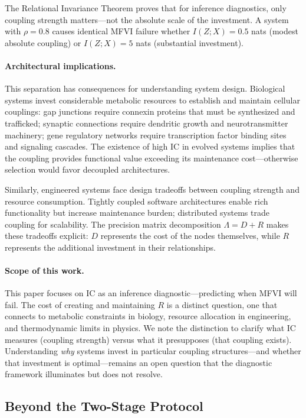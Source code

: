 \documentclass[10pt]{article} %
\theoremstyle{plain}
\theoremstyle{definition}
\begin{document}
\noindent The Relational Invariance Theorem proves that for inference diagnostics, only coupling strength matters---not the absolute scale of the investment. A system with $\rho = 0.8$ causes identical MFVI failure whether $I(Z;X) = 0.5$ nats (modest absolute coupling) or $I(Z;X) = 5$ nats (substantial investment).

\paragraph{Architectural implications.} This separation has consequences for understanding system design. Biological systems invest considerable metabolic resources to establish and maintain cellular couplings: gap junctions require connexin proteins that must be synthesized and trafficked; synaptic connections require dendritic growth and neurotransmitter machinery; gene regulatory networks require transcription factor binding sites and signaling cascades. The existence of high IC in evolved systems implies that the coupling provides functional value exceeding its maintenance cost---otherwise selection would favor decoupled architectures.

Similarly, engineered systems face design tradeoffs between coupling strength and resource consumption. Tightly coupled software architectures enable rich functionality but increase maintenance burden; distributed systems trade coupling for scalability. The precision matrix decomposition $\Lambda = D + R$ makes these tradeoffs explicit: $D$ represents the cost of the nodes themselves, while $R$ represents the additional investment in their relationships.

\paragraph{Scope of this work.} This paper focuses on IC as an inference diagnostic---predicting when MFVI will fail. The cost of creating and maintaining $R$ is a distinct question, one that connects to metabolic constraints in biology, resource allocation in engineering, and thermodynamic limits in physics. We note the distinction to clarify what IC measures (coupling strength) versus what it presupposes (that coupling exists). Understanding \emph{why} systems invest in particular coupling structures---and whether that investment is optimal---remains an open question that the diagnostic framework illuminates but does not resolve.

\subsection{Beyond the Two-Stage Protocol}
\label{sec:higher_order}
\end{document}
